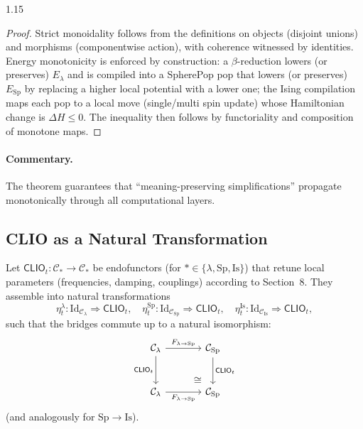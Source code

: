 \documentclass[12pt,a4paper]{article}
\begin{document}
\begin{spacing}{1.15}
\begin{proof}
Strict monoidality follows from the definitions on objects (disjoint unions) and morphisms (componentwise action), with coherence witnessed by identities. Energy monotonicity is enforced by construction: a $\beta$-reduction lowers (or preserves) $E_{\lambda}$ and is compiled into a SpherePop pop that lowers (or preserves) $E_{\mathrm{Sp}}$ by replacing a higher local potential with a lower one; the Ising compilation maps each pop to a local move (single/multi spin update) whose Hamiltonian change is $\Delta H\le 0$. The inequality then follows by functoriality and composition of monotone maps.
\end{proof}

\paragraph{Commentary.}
The theorem guarantees that “meaning-preserving simplifications” propagate monotonically through all computational layers.

\subsection{CLIO as a Natural Transformation}

\begin{definition}
Let $\mathsf{CLIO}_{t}\colon \mathcal{C}_{*}\to\mathcal{C}_{*}$ be endofunctors (for $* \in \{\lambda,\mathrm{Sp},\mathrm{Is}\}$) that retune local parameters (frequencies, damping, couplings) according to Section~8. They assemble into natural transformations
\[
\eta^{\lambda}_{t}:\mathrm{Id}_{\mathcal{C}_{\lambda}}\Rightarrow \mathsf{CLIO}_{t},\quad
\eta^{\mathrm{Sp}}_{t}:\mathrm{Id}_{\mathcal{C}_{\mathrm{Sp}}}\Rightarrow \mathsf{CLIO}_{t},\quad
\eta^{\mathrm{Is}}_{t}:\mathrm{Id}_{\mathcal{C}_{\mathrm{Is}}}\Rightarrow \mathsf{CLIO}_{t},
\]
such that the bridges commute up to a natural isomorphism:
\[
\begin{tikzcd}[column sep=large,row sep=large]
\mathcal{C}_{\lambda} \arrow[r,"F_{\lambda\to\mathrm{Sp}}"] \arrow[d,swap,"\mathsf{CLIO}_{t}"]
 & \mathcal{C}_{\mathrm{Sp}} \arrow[d,"\mathsf{CLIO}_{t}"] \\
\mathcal{C}_{\lambda} \arrow[r,swap,"F_{\lambda\to\mathrm{Sp}}"]
 & \mathcal{C}_{\mathrm{Sp}}
 \arrow[lu,phantom,"\cong" very near start]
\end{tikzcd}
\]
(and analogously for $\mathrm{Sp}\to\mathrm{Is}$).
\end{definition}


\end{spacing}
\end{document}
